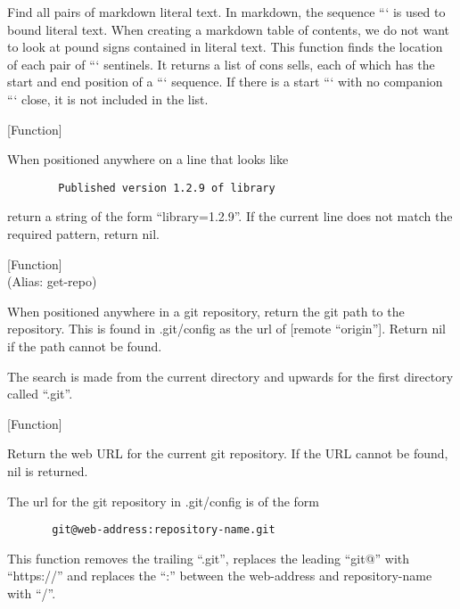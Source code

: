 \begin{doc-string}
Find all pairs of markdown literal text.  In markdown, the sequence ``` is
used to bound literal text.  When creating a markdown table of contents, we do
not want to look at pound signs contained in literal text.  This function finds
the location of each pair of ``` sentinels.  It returns a list of cons sells,
each of which has the start and end position of a ``` sequence.  If there is a
start ``` with no companion ``` close, it is not included in the list.
\end{doc-string}

\vspace{1em}
\noindent
{}
\usebox{\funcname}
 \hfill [Function]

\begin{doc-string}
When positioned anywhere on a line that looks like

\small{\begin{verbatim}
        Published version 1.2.9 of library
\end{verbatim}}

return a string of the form ``library=1.2.9''.  If the current line does not
match the required pattern, return nil.
\end{doc-string}

\vspace{1em}
\noindent
{}
\usebox{\funcname}
 \hfill [Function]\\%
 (Alias: get-repo)

\begin{doc-string}
When positioned anywhere in a git repository, return the git path to the
repository.  This is found in .git/config as the url of [remote ``origin''].
Return nil if the path cannot be found.

The search is made from the current directory and upwards for the first
directory called ``.git''.
\end{doc-string}

\vspace{1em}
\noindent
{}
\usebox{\funcname}
 \hfill [Function]

\begin{doc-string}
Return the web URL for the current git repository.  If the URL cannot be
found, nil is returned.

The url for the git repository in .git/config is of the form

\small{\begin{verbatim}
       git@web-address:repository-name.git
\end{verbatim}}

This function removes the trailing ``.git'', replaces the leading ``git@'' with
``https://'' and replaces the ``:'' between the web-address and repository-name
with ``/''.
\end{doc-string}

